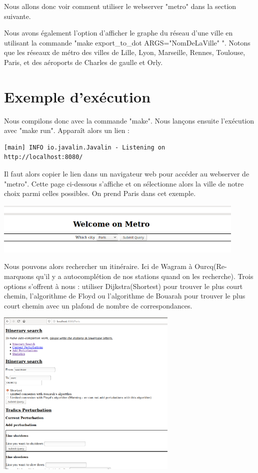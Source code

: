 \documentclass[french, 12pt]{article}
\begin{document}
Nous allons donc voir comment utiliser le webserver "metro" dans la section suivante.

Nous avons également l'option d'afficher le graphe du réseau d'une ville en utilisant la commande "make export\_to\_dot ARGS="NomDeLaVille" ". Notons que les réseaux de métro des villes de Lille, Lyon, Marseille, Rennes, Toulouse, Paris, et des aéroports de Charles de gaulle et Orly.

\section{Exemple d'exécution}
Nous compilons donc avec la commande "make".
Nous lançons ensuite l'exécution avec "make run".
Apparaît alors un lien :

\begin{lstlisting}
[main] INFO io.javalin.Javalin - Listening on 
http://localhost:8080/
\end{lstlisting}

Il faut alors copier le lien dans un navigateur web pour accéder au webserver de "metro". Cette page ci-dessous s'affiche et on sélectionne alors la ville de notre choix parmi celles possibles. On prend Paris dans cet exemple.

\includegraphics[width=12cm]{images/index.png}

Nous pouvons alors rechercher un itinéraire. Ici de Wagram à Ourcq(Re-marquons qu'il y a autocomplétion de nos stations quand on les recherche). Trois options s'offrent à nous : utiliser Dijkstra(Shortest) pour trouver le plus court chemin, l'algorithme de Floyd ou l'algorithme de Bouarah pour trouver le plus court chemin avec un plafond de nombre de correspondances.

\includegraphics[height=8cm]{images/researchwithoutpert.png}
\end{document}
